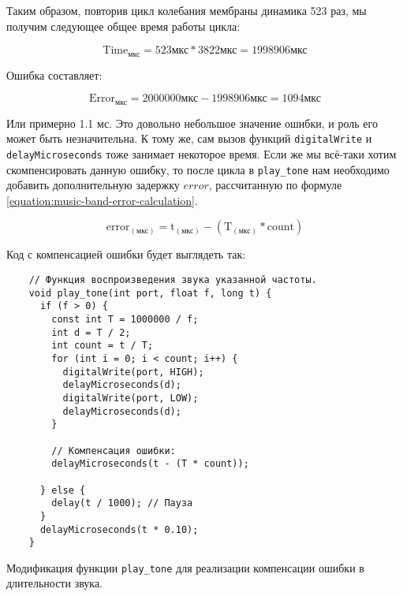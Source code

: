 \documentclass[../sparc.tex]{subfiles}
\begin{document}
Таким образом, повторив цикл колебания мембраны динамика 523 раз, мы получим
следующее общее время работы цикла:

\begin{equation}
  \mbox{Time}_{\mbox{мкс}} = 523 \mbox{мкс} * 3822 \mbox{мкс} = 1998906 \mbox{мкс}
\end{equation}

Ошибка составляет:

\begin{equation}
  \mbox{Error}_{\mbox{мкс}} = 2000000 \mbox{мкс} - 1998906 \mbox{мкс} = 1094 \mbox{мкс}
\end{equation}

Или примерно 1.1 мс.  Это довольно небольшое значение ошибки, и роль его может
быть незначительна.  К тому же, сам вызов функций \texttt{digitalWrite} и
\texttt{delayMicroseconds} тоже занимает некоторое время.  Если же мы всё-таки
хотим скомпенсировать данную ошибку, то после цикла в \texttt{play\_tone} нам
необходимо добавить дополнительную задержку $error$, рассчитанную по формуле
\ref{equation:music-band-error-calculation}.

\begin{equation}
  \mbox{error}_{(\mbox{мкс})} = \mbox{t}_{(\mbox{мкс})} -
  (\mbox{T}_{(\mbox{мкс})} * \mbox{count})
  \label{equation:music-band-error-calculation}
\end{equation}

Код с компенсацией ошибки будет выглядеть так:

\begin{listing}[!h]
  \begin{verbatim}
    // Функция воспроизведения звука указанной частоты.
    void play_tone(int port, float f, long t) {
      if (f > 0) {
        const int T = 1000000 / f;
        int d = T / 2;
        int count = t / T;
        for (int i = 0; i < count; i++) {
          digitalWrite(port, HIGH);
          delayMicroseconds(d);
          digitalWrite(port, LOW);
          delayMicroseconds(d);
        }

        // Компенсация ошибки:
        delayMicroseconds(t - (T * count));

      } else {
        delay(t / 1000); // Пауза
      }
      delayMicroseconds(t * 0.10);
    }
  \end{verbatim}
  \label{listing:music-band-play-tone-with-error-compensation}
  \caption{Модификация функции \texttt{play\_tone} для реализации компенсации
    ошибки в длительности звука.}
\end{listing}
\end{document}
